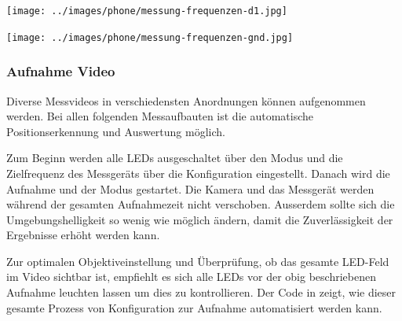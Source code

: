 \noindent\begin{minipage}[t]{.497\linewidth}\vspace{0pt}
    \begin{centering}
        \texttt{[image: ../images/phone/messung-frequenzen-d1.jpg]}
        \vspace{-2.5em}
        \label{img:Messpunkt-LED}
    \end{centering}
\end{minipage}
\noindent\begin{minipage}[t]{.497\linewidth}\vspace{0pt}
    \begin{centering}
        \texttt{[image: ../images/phone/messung-frequenzen-gnd.jpg]}
        \vspace{-2.5em}
        \label{img:Messpunkt-GND}
    \end{centering}
\end{minipage}




\subsubsection{Aufnahme Video}

Diverse Messvideos in verschiedensten Anordnungen können aufgenommen werden.
Bei allen folgenden Messaufbauten ist die automatische Positionserkennung und Auswertung möglich.

Zum Beginn werden alle LEDs ausgeschaltet über den  Modus und die Zielfrequenz des Messgeräts über die Konfiguration  eingestellt.
Danach wird die Aufnahme und der  Modus gestartet.
Die Kamera und das Messgerät werden während der gesamten Aufnahmezeit nicht verschoben.
Ausserdem sollte sich die Umgebungshelligkeit so wenig wie möglich ändern, damit die Zuverlässigkeit der Ergebnisse erhöht werden kann.

Zur optimalen Objektiveinstellung und Überprüfung, ob das gesamte LED-Feld im Video sichtbar ist,
empfiehlt es sich alle LEDs vor der obig beschriebenen Aufnahme leuchten lassen um dies zu kontrollieren.
%
Der Code in  zeigt, wie dieser gesamte Prozess von Konfiguration zur Aufnahme automatisiert werden kann.

